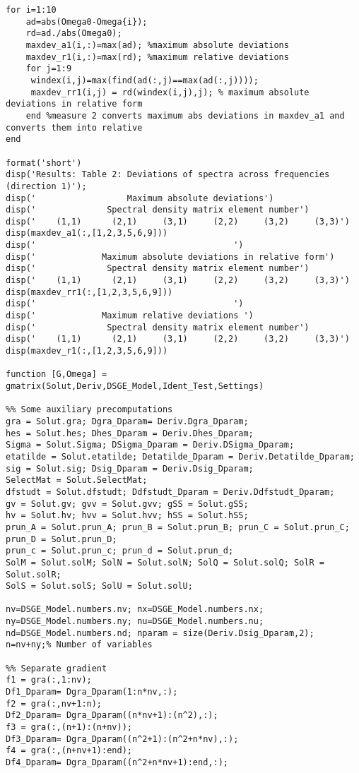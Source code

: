 \documentclass{article}
\begin{document}
\begin{verbatim}
for i=1:10
    ad=abs(Omega0-Omega{i});
    rd=ad./abs(Omega0);
    maxdev_a1(i,:)=max(ad); %maximum absolute deviations
    maxdev_r1(i,:)=max(rd); %maximum relative deviations
    for j=1:9
     windex(i,j)=max(find(ad(:,j)==max(ad(:,j))));
     maxdev_rr1(i,j) = rd(windex(i,j),j); % maximum absolute deviations in relative form
    end %measure 2 converts maximum abs deviations in maxdev_a1 and converts them into relative
end

format('short')
disp('Results: Table 2: Deviations of spectra across frequencies (direction 1)');
disp('                  Maximum absolute deviations')
disp('              Spectral density matrix element number')
disp('    (1,1)      (2,1)     (3,1)     (2,2)     (3,2)     (3,3)')
disp(maxdev_a1(:,[1,2,3,5,6,9]))
disp('                                       ')
disp('             Maximum absolute deviations in relative form')
disp('              Spectral density matrix element number')
disp('    (1,1)      (2,1)     (3,1)     (2,2)     (3,2)     (3,3)')
disp(maxdev_rr1(:,[1,2,3,5,6,9]))
disp('                                       ')
disp('             Maximum relative deviations ')
disp('              Spectral density matrix element number')
disp('    (1,1)      (2,1)     (3,1)     (2,2)     (3,2)     (3,3)')
disp(maxdev_r1(:,[1,2,3,5,6,9]))

function [G,Omega] = gmatrix(Solut,Deriv,DSGE_Model,Ident_Test,Settings)

%% Some auxiliary precomputations
gra = Solut.gra; Dgra_Dparam= Deriv.Dgra_Dparam;
hes = Solut.hes; Dhes_Dparam = Deriv.Dhes_Dparam;
Sigma = Solut.Sigma; DSigma_Dparam = Deriv.DSigma_Dparam;
etatilde = Solut.etatilde; Detatilde_Dparam = Deriv.Detatilde_Dparam;
sig = Solut.sig; Dsig_Dparam = Deriv.Dsig_Dparam;
SelectMat = Solut.SelectMat;
dfstudt = Solut.dfstudt; Ddfstudt_Dparam = Deriv.Ddfstudt_Dparam;
gv = Solut.gv; gvv = Solut.gvv; gSS = Solut.gSS;
hv = Solut.hv; hvv = Solut.hvv; hSS = Solut.hSS;
prun_A = Solut.prun_A; prun_B = Solut.prun_B; prun_C = Solut.prun_C; prun_D = Solut.prun_D;
prun_c = Solut.prun_c; prun_d = Solut.prun_d;
SolM = Solut.solM; SolN = Solut.solN; SolQ = Solut.solQ; SolR = Solut.solR;
SolS = Solut.solS; SolU = Solut.solU;

nv=DSGE_Model.numbers.nv; nx=DSGE_Model.numbers.nx; ny=DSGE_Model.numbers.ny; nu=DSGE_Model.numbers.nu;
nd=DSGE_Model.numbers.nd; nparam = size(Deriv.Dsig_Dparam,2);
n=nv+ny;% Number of variables

%% Separate gradient
f1 = gra(:,1:nv);
Df1_Dparam= Dgra_Dparam(1:n*nv,:);
f2 = gra(:,nv+1:n);
Df2_Dparam= Dgra_Dparam((n*nv+1):(n^2),:);
f3 = gra(:,(n+1):(n+nv));
Df3_Dparam= Dgra_Dparam((n^2+1):(n^2+n*nv),:);
f4 = gra(:,(n+nv+1):end);
Df4_Dparam= Dgra_Dparam((n^2+n*nv+1):end,:);


\end{verbatim}
\end{document}
